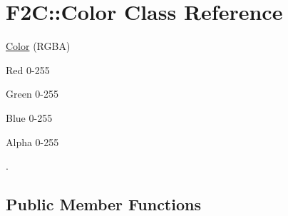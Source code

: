 \hypertarget{class_f2_c_1_1_color}{
\section{F2C::Color Class Reference}
\label{class_f2_c_1_1_color}
}


\hyperlink{class_f2_c_1_1_color}{Color} (RGBA) \par
 Red 0-\/255 \par
 Green 0-\/255 \par
 Blue 0-\/255 \par
 Alpha 0-\/255 \par
.  
\subsection*{Public Member Functions}
